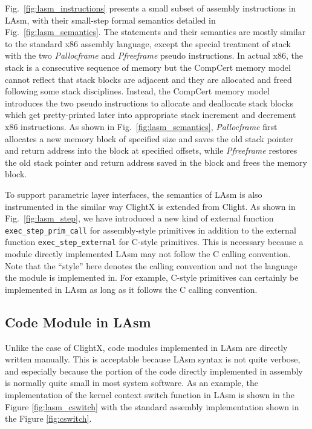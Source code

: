 Fig.~\ref{fig:lasm_instructions} presents a small subset of assembly
instructions in LAsm, with their small-step formal semantics
detailed in Fig.~\ref{fig:lasm_semantics}.
The statements and their semantics are
mostly similar to the standard x86 assembly language, except the
special treatment of stack with the two {\it Pallocframe} and {\it Pfreeframe}
pseudo instructions. In actual x86, the stack is a consecutive sequence
of memory but the CompCert memory model cannot reflect that stack blocks
are adjacent and they are allocated and freed following some stack disciplines.
Instead, the CompCert memory model introduces the two pseudo instructions
to allocate and deallocate stack blocks which get pretty-printed later
into appropriate stack increment and decrement x86 instructions. 
As shown in Fig.~\ref{fig:lasm_semantics}, {\it Pallocframe} first allocates
a new memory block of specified size and saves the old stack pointer and return
address into the block at specified offsets, while {\it Pfreeframe} restores
the old stack pointer and return address saved in the block and frees the memory
block.

To support parametric layer interfaces, the semantics of LAsm is also instrumented
in the similar way ClightX is extended from Clight.
As shown in Fig.~\ref{fig:lasm_step}, we have introduced a new kind of
external function \texttt{exec\_step\_prim\_call} for assembly-style primitives
in addition to the external function \texttt{exec\_step\_external} for C-style primitives.
This is necessary because a module directly implemented LAsm may not follow the C
calling convention. Note that the ``style'' here denotes the calling convention
and not the language the module is implemented in. For example, C-style
primitives can certainly be implemented in LAsm as long as it follows the C calling
convention.


\subsection{Code Module in LAsm}

Unlike the case of ClightX, code modules implemented in LAsm are
directly written manually. This is acceptable because LAsm syntax
is not quite verbose, and especially because the portion of the code
directly implemented in assembly is normally quite small in most
system software. As an example, the implementation of the kernel
context switch function in LAsm is shown in the Figure \ref{fig:lasm_cswitch}
with the standard assembly implementation shown in the Figure \ref{fig:cswitch}.

